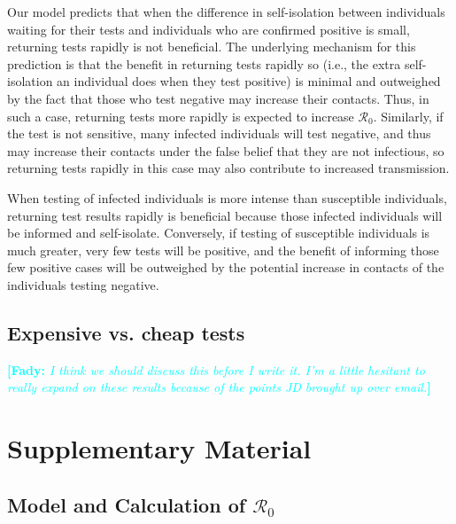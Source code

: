 \documentclass[12pt]{article}
\newcommand{\comment}{\showcomment}
\newcommand{\showcomment}[3]{\textcolor{#1}{\textbf{[#2: }\textsl{#3}\textbf{]}}}
\newcommand{\fady}[1]{\comment{cyan}{Fady}{#1}}
\newcommand{\Rnum}{\mathcal{R}_0}
\theoremstyle{definition} %
\begin{document}
Our model predicts that when the difference in self-isolation between individuals waiting for their tests and individuals who are confirmed positive is small, returning tests rapidly is not beneficial. The underlying mechanism for this prediction is that the benefit in returning tests rapidly so (i.e., the extra self-isolation an individual does when they test positive) is minimal and outweighed by the fact that those who test negative may increase their contacts. Thus, in such a case, returning tests more rapidly is expected to increase $\Rnum$. Similarly, if the test is not sensitive, many infected individuals will test negative, and thus may increase their contacts under the false belief that they are not infectious, so returning tests rapidly in this case may also contribute to increased transmission.

When testing of infected individuals is more intense than susceptible individuals, returning test results rapidly is beneficial because those infected individuals will be informed and self-isolate. Conversely, if testing of susceptible individuals is much greater, very few tests will be positive, and the benefit of informing those few positive cases will be outweighed by the potential increase in contacts of the individuals testing negative. 


\subsection{Expensive vs. cheap tests}
\fady{I think we should discuss this before I write it. I'm a little hesitant to really expand on these results because of the points JD brought up over email.}




\section{Supplementary Material}

\subsection{Model and Calculation of $\Rnum$}
\end{document}
